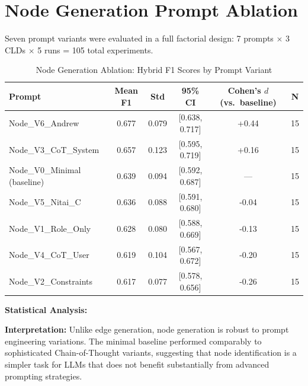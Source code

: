 \chapter{Node Generation Prompt Ablation}
\label{sec:ablation_node}

Seven prompt variants were evaluated in a full factorial design: 7 prompts $\times$ 3 CLDs $\times$ 5 runs = 105 total experiments.

\begin{table}[H]
\centering
\caption{Node Generation Ablation: Hybrid F1 Scores by Prompt Variant}
\label{tab:node_ablation}
\footnotesize
\begin{tabular}{@{}lccccc@{}}
\toprule
\textbf{Prompt} & \textbf{Mean F1} & \textbf{Std} & \textbf{95\% CI} & \textbf{Cohen's $d$ (vs.\ baseline)} & \textbf{N} \\
\midrule
Node\_V6\_Andrew & 0.677 & 0.079 & [0.638, 0.717] & +0.44 & 15 \\
Node\_V3\_CoT\_System & 0.657 & 0.123 & [0.595, 0.719] & +0.16 & 15 \\
Node\_V0\_Minimal (baseline) & 0.639 & 0.094 & [0.592, 0.687] & --- & 15 \\
Node\_V5\_Nitai\_C & 0.636 & 0.088 & [0.591, 0.680] & -0.04 & 15 \\
Node\_V1\_Role\_Only & 0.628 & 0.080 & [0.588, 0.669] & -0.13 & 15 \\
Node\_V4\_CoT\_User & 0.619 & 0.104 & [0.567, 0.672] & -0.20 & 15 \\
Node\_V2\_Constraints & 0.617 & 0.077 & [0.578, 0.656] & -0.26 & 15 \\
\bottomrule
\end{tabular}
\end{table}

\textbf{Statistical Analysis:}
\begin{itemize}[noitemsep]
\end{itemize}

\textbf{Interpretation:} Unlike edge generation, node generation is robust to prompt engineering variations. The minimal baseline performed comparably to sophisticated Chain-of-Thought variants, suggesting that node identification is a simpler task for LLMs that does not benefit substantially from advanced prompting strategies.

